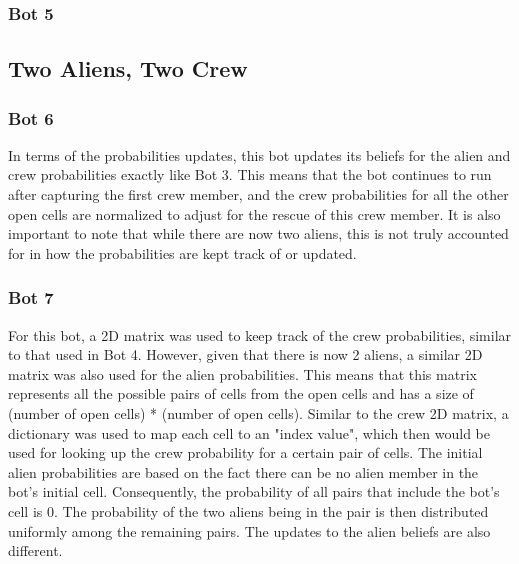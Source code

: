 \documentclass[11pt]{article}
\begin{document}
\subsubsection{Bot 5}

\subsection{Two Aliens, Two Crew}

\subsubsection{Bot 6}
In terms of the probabilities updates, this bot updates its beliefs for the alien and crew probabilities exactly like Bot 3. This means that the bot continues to run after capturing the first crew member, and the crew probabilities for all the other open cells are normalized to adjust for the rescue of this crew member. It is also important to note that while there are now two aliens, this is not truly accounted for in how the probabilities are kept track of or updated. 
\subsubsection{Bot 7}
For this bot, a 2D matrix was used to keep track of the crew probabilities, similar to that used in Bot 4. However, given that there is now 2 aliens, a similar 2D matrix was also used for the alien probabilities. This means that this matrix represents all the possible pairs of cells from the open cells and has a size of (number of open cells) * (number of open cells). Similar to the crew 2D matrix, a dictionary was used to map each cell to an "index value", which then would be used for looking up the crew probability for a certain pair of cells. The initial alien probabilities are based on the fact there can be no alien member in the bot's initial cell. Consequently, the probability of all pairs that include the bot's cell is 0. The probability of the two aliens being in the pair is then distributed uniformly among the remaining pairs. The updates to the alien beliefs are also different.
\medskip
\end{document}
